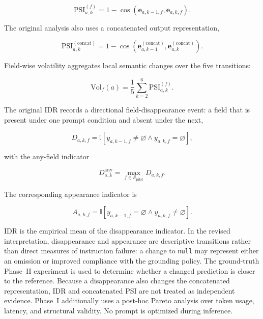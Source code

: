 \documentclass[fleqn,10pt]{wlscirep-authoryear}
\begin{document}
\begin{equation}
\mathrm{PSI}^{(f)}_{a,k}
=
1-
\cos
\left(
\mathbf{e}_{a,k-1,f},
\mathbf{e}_{a,k,f}
\right).
\label{eq:pilot-psi}
\end{equation}

The original analysis also uses a concatenated output representation,

\begin{equation}
\mathrm{PSI}^{(\mathrm{concat})}_{a,k}
=
1-
\cos
\left(
\mathbf{e}^{(\mathrm{concat})}_{a,k-1},
\mathbf{e}^{(\mathrm{concat})}_{a,k}
\right).
\end{equation}

Field-wise volatility aggregates local semantic changes over the five transitions:

\begin{equation}
\mathrm{Vol}_{f}(a)
=
\frac{1}{5}
\sum_{k=2}^{6}
\mathrm{PSI}^{(f)}_{a,k}.
\label{eq:pilot-vol}
\end{equation}

The original IDR records a directional field-disappearance event: a field that is
present under one prompt condition and absent under the next,

\begin{equation}
D_{a,k,f}
=
\mathbb{I}
\left[
y_{a,k-1,f}\neq\varnothing
\wedge
y_{a,k,f}=\varnothing
\right],
\end{equation}

with the any-field indicator

\begin{equation}
D^{\mathrm{any}}_{a,k}
=
\max_{f\in\mathcal{S}_{\mathrm{pilot}}}
D_{a,k,f}.
\end{equation}

The corresponding appearance indicator is

\begin{equation}
A_{a,k,f}
=
\mathbb{I}
\left[
y_{a,k-1,f}=\varnothing
\wedge
y_{a,k,f}\neq\varnothing
\right].
\end{equation}

IDR is the empirical mean of the disappearance indicator. In the revised
interpretation, disappearance and appearance are descriptive transitions rather
than direct measures of instruction failure: a change to \texttt{null} may
represent either an omission or improved compliance with the grounding policy.
The ground-truth Phase~II experiment is used to determine whether a changed
prediction is closer to the reference. Because a disappearance also changes the
concatenated representation, IDR and concatenated PSI are not treated as
independent evidence. Phase~I additionally uses a post-hoc Pareto analysis over
token usage, latency, and structural validity. No prompt is optimized during
inference.
\end{document}
